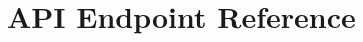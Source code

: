 \documentclass[a4paper,twoside]{sapthesis}
\begin{document}

\appendix

\chapter{API Endpoint Reference}
\label{app:api-reference}
%
%
%
\end{document}
